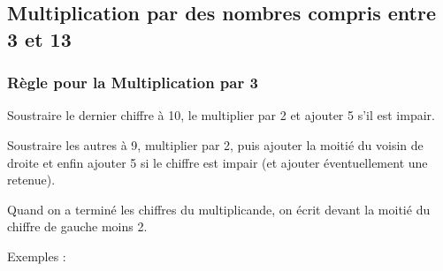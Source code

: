 \documentclass[a4paper]{article}
\begin{document}
\pagebreak

\subsection{Multiplication par des nombres compris entre 3 et 13}

\subsubsection*{Règle pour la Multiplication par 3}

Soustraire le dernier chiffre à 10, le multiplier par 2 et ajouter 5 s'il est impair.

Soustraire les autres à 9, multiplier par 2, puis ajouter la moitié du voisin de droite et enfin ajouter 5 si le chiffre est impair (et ajouter éventuellement une retenue).

Quand on a terminé les chiffres du multiplicande, on écrit devant la moitié du chiffre de gauche moins 2.\\

\vspace{-2 mm}

{ \parindent=0.5cm Exemples : }
\end{document}
